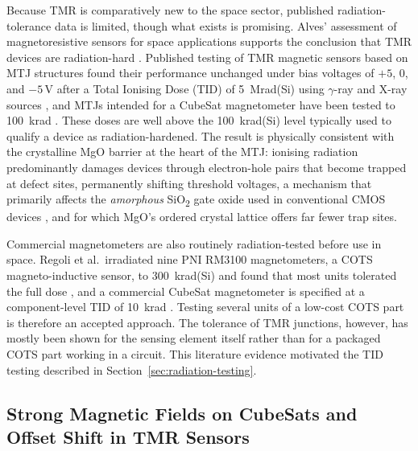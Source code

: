 \documentclass[12pt,a4paper]{article}
\begin{document}
Because TMR is comparatively new to the space sector, published radiation-tolerance data is limited, though what exists is promising. Alves' assessment of magnetoresistive sensors for space applications supports the conclusion that TMR devices are radiation-hard \cite{alves-thesis}. Published testing of TMR magnetic sensors based on MTJ structures found their performance unchanged under bias voltages of $+5$, $0$, and $-5\,\text{V}$ after a Total Ionising Dose (TID) of \SI{5}{\mega rad}(Si) using $\gamma$-ray and X-ray sources \cite{tmr-bias-radiation}, and MTJs intended for a CubeSat magnetometer have been tested to \SI{100}{\kilo rad} \cite{nguyen2010}. These doses are well above the \SI{100}{\kilo rad}(Si) level typically used to qualify a device as radiation-hardened. The result is physically consistent with the crystalline MgO barrier at the heart of the MTJ: ionising radiation predominantly damages devices through electron-hole pairs that become trapped at defect sites, permanently shifting threshold voltages, a mechanism that primarily affects the \emph{amorphous} SiO\textsubscript{2} gate oxide used in conventional CMOS devices \cite{tid-basics-lanl}, and for which MgO's ordered crystal lattice offers far fewer trap sites.

Commercial magnetometers are also routinely radiation-tested before use in space. Regoli et al.\ irradiated nine PNI RM3100 magnetometers, a COTS magneto-inductive sensor, to \SI{300}{\kilo rad}(Si) and found that most units tolerated the full dose \cite{regoli2020}, and a commercial CubeSat magnetometer is specified at a component-level TID of \SI{10}{\kilo rad} \cite{nss_magnetometer}. Testing several units of a low-cost COTS part is therefore an accepted approach. The tolerance of TMR junctions, however, has mostly been shown for the sensing element itself rather than for a packaged COTS part working in a circuit. This literature evidence motivated the TID testing described in Section~\ref{sec:radiation-testing}.

\subsection{Strong Magnetic Fields on CubeSats and Offset Shift in TMR Sensors}
\label{sec:strong-field-lit}
\end{document}

